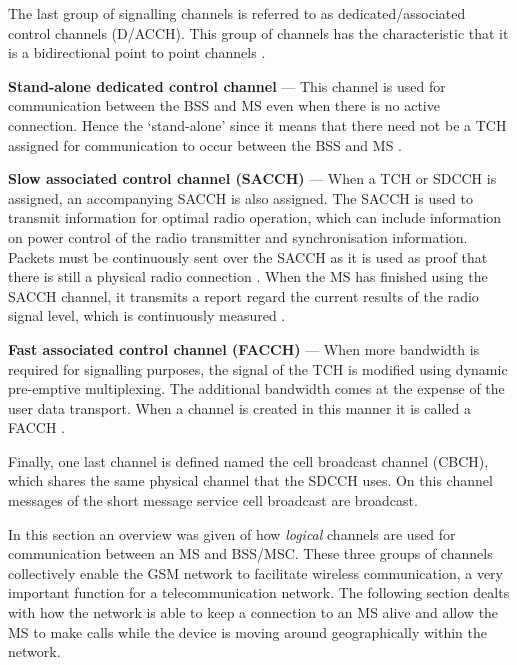The last group of signalling channels is referred to as dedicated/associated control channels (D/ACCH). This group of channels has the characteristic that it is a bidirectional point to point channels \cite{GSMArchitectureProtocolsServices}.
\begin{description}
\item{\textbf{Stand-alone dedicated control channel}} --- This channel is used for communication between the BSS and MS even when there is no active connection. Hence the `stand-alone' since it means that there need not be a TCH assigned for communication to occur between the BSS and MS \cite{GSMArchitectureProtocolsServices}.
\item{\textbf{Slow associated control channel (SACCH)}} --- When a TCH or SDCCH is assigned, an accompanying SACCH is also assigned. The SACCH is used to transmit information for optimal radio operation, which can include information on power control of the radio transmitter and synchronisation information. Packets must be continuously sent over the SACCH as it is used as proof that there is still a physical radio connection \cite{GSMArchitectureProtocolsServices}. When the MS has finished using the SACCH channel, it transmits a report regard the current results of the radio signal level, which is continuously measured \cite{GSMArchitectureProtocolsServices}.
\item{\textbf{Fast associated control channel (FACCH)}} --- When more bandwidth is required for signalling purposes, the signal of the TCH is modified using dynamic pre-emptive multiplexing. The additional bandwidth comes at the expense of the user data transport. When a channel is created in this manner it is called a FACCH \cite{GSMArchitectureProtocolsServices}.
\end{description}

Finally, one last channel is defined named the cell broadcast channel (CBCH), which shares the same physical channel that the SDCCH uses. On this channel messages of the short message service cell broadcast are broadcast\cite{GSMArchitectureProtocolsServices}.

In this section an overview was given of how \emph{logical} channels are used for communication between an MS and BSS/MSC. These three groups of channels collectively enable the GSM network to facilitate wireless communication, a very important function for a telecommunication network. The following section dealts with how the network is able to keep a connection to an MS alive and allow the MS to make calls while the device is moving around geographically within the network.
